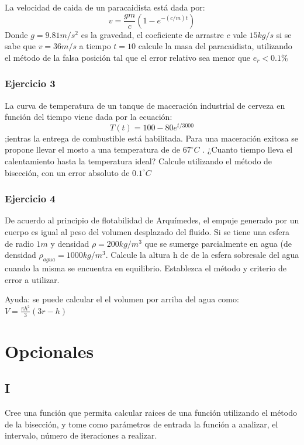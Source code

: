 \documentclass[a4paper,11pt]{article}
\theoremstyle{mytheor}
\begin{document}
La velocidad de caida de un paracaidista está dada por:
$$\displaystyle v = \frac{gm}{c} (1 - e^{ -(c/m) t})$$
Donde $g=9.81 m/s^2$ es la gravedad, el coeficiente de arrastre $c$ vale $15kg/s$ si se sabe que $v= 36 m/s$ a tiempo $t=10$ calcule la masa del paracaidista, utilizando el método de la falsa posición tal que el error relativo sea menor que $e_r < 0.1\%$


\subsubsection*{Ejercicio 3}

La curva de temperatura de un tanque de maceración industrial de cerveza en función del tiempo viene dada por la ecuación:
$$ T(t) = 100 - 80e^{t/3000}$$
;ientras la entrega de combustible está habilitada. Para una maceración exitosa se propone llevar el mosto a una temperatura de de $67^\circ C$ . ¿Cuanto tiempo lleva el calentamiento hasta la temperatura ideal? Calcule utilizando el método de bisección, con un error absoluto de $0.1^\circ C$

\subsubsection*{Ejercicio 4}

De acuerdo al principio de flotabilidad de Arquímedes, el empuje generado por un cuerpo es igual al peso del volumen desplazado del fluido. Si se tiene una esfera de radio $1m$ y densidad $\rho = 200kg/m^3$ que se sumerge parcialmente en agua (de densidad $\rho_{agua}=1000kg/m^3$. Calcule la altura h de de la esfera sobresale del agua  cuando la misma se encuentra en equilibrio. Establezca el método y criterio de error a utilizar.

Ayuda: se puede calcular el el volumen por arriba del agua como:
$V = \frac{\pi h^2}{3} (3r-h)$









\section*{Opcionales}

\subsection*{I}
Cree una función que permita calcular raices de una función utilizando el método de la bisección, y tome como parámetros de entrada la función a analizar, el intervalo, número de iteraciones a realizar.
\end{document}
